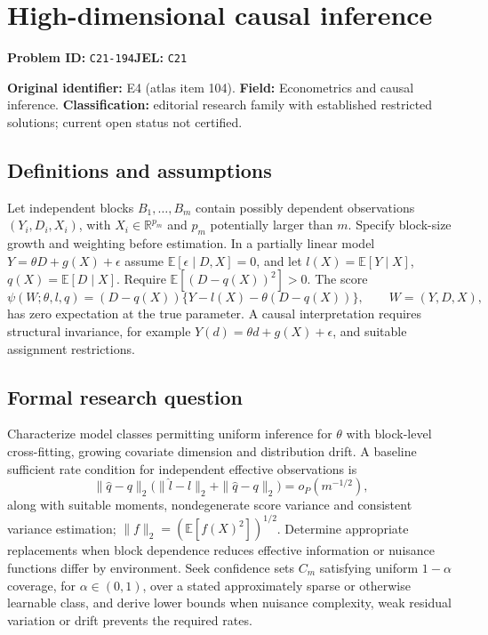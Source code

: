 \documentclass[11pt,a4paper]{article}
\begin{document}
\section*{High-dimensional causal inference}
\textbf{Problem ID:} \texttt{C21-194}\quad \textbf{JEL:} \texttt{C21}\par
\label{problem:OP-0104}
\label{atlas:prob:E4}

\noindent\textbf{Original identifier:} E4 (atlas item 104). \textbf{Field:} Econometrics and causal inference. \textbf{Classification:} editorial research family with established restricted solutions; current open status not certified.

\subsection*{Definitions and assumptions}

Let independent blocks $B_1,\ldots,B_m$ contain possibly dependent observations $(Y_i,D_i,X_i)$, with $X_i\in\mathbb R^{p_m}$ and $p_m$ potentially larger than $m$. Specify block-size growth and weighting before estimation. In a partially linear model $Y=\theta D+g(X)+\epsilon$ assume $\mathbb E[\epsilon\mid D,X]=0$, and let $l(X)=\mathbb E[Y\mid X]$, $q(X)=\mathbb E[D\mid X]$. Require $\mathbb E[(D-q(X))^2]>0$. The score
\[
\psi(W;\theta,l,q)=(D-q(X))\{Y-l(X)-\theta(D-q(X))\},
\qquad W=(Y,D,X),
\]
has zero expectation at the true parameter. A causal interpretation requires structural invariance, for example $Y(d)=\theta d+g(X)+\epsilon$, and suitable assignment restrictions.

\subsection*{Formal research question}

Characterize model classes permitting uniform inference for $\theta$ with block-level cross-fitting, growing covariate dimension and distribution drift. A baseline sufficient rate condition for independent effective observations is
\[
\|\widehat q-q\|_2
\bigl(\|\widehat l-l\|_2+\|\widehat q-q\|_2\bigr)
=o_P(m^{-1/2}),
\]
along with suitable moments, nondegenerate score variance and consistent variance estimation; $\|f\|_2=(\mathbb E[f(X)^2])^{1/2}$. Determine appropriate replacements when block dependence reduces effective information or nuisance functions differ by environment. Seek confidence sets $C_m$ satisfying uniform $1-\alpha$ coverage, for $\alpha\in(0,1)$, over a stated approximately sparse or otherwise learnable class, and derive lower bounds when nuisance complexity, weak residual variation or drift prevents the required rates.
\end{document}
